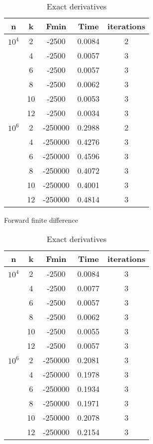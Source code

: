 \documentclass{article}
\begin{document}
\begin{table}[!htb]
    
    \begin{minipage}{.5\linewidth}
      
      \centering
        \begin{tabular}{|c c c c c |} 
 \hline
 n & k & Fmin & Time & iterations  \\ [0.5ex] 
 \hline\hline

   $10^{4}$ & 2 & -2500 &  0.0084 & 2 \\ 
  &  4 & -2500 &  0.0057 & 3\\
  &  6 & -2500 & 0.0057 & 3 \\
  &  8 & -2500 & 0.0062 & 3 \\
  &  10 & -2500 & 0.0053 & 3 \\
  &  12 & -2500 & 0.0034& 3 \\
  \hline
  $10^{6}$ & 2 & -250000 & 0.2988 & 2 \\ 
  &  4 & -250000 & 0.4276 & 3\\
  &  6 & -250000 & 0.4596 & 3\\
  &  8 & -250000 &  0.4072& 3 \\
  &  10 & -250000 & 0.4001 & 3\\
  &  12 & -250000 & 0.4814 & 3 \\
 \hline
 \end{tabular}
 \caption{Forward finite difference}
    \end{minipage}%
    \begin{minipage}{.5\linewidth}
      \centering
        
        \begin{tabular}{|c c c c c |} 
 \hline
 n & k & Fmin & Time & iterations  \\ [0.5ex] 
 \hline\hline

   $10^{4}$ & 2 & -2500 &  0.0084 & 3 \\ 
  &  4 & -2500 &  0.0077 & 3\\
  &  6 & -2500 & 0.0057 & 3 \\
  &  8 & -2500 & 0.0062 & 3 \\
  &  10 & -2500 & 0.0055 & 3 \\
  &  12 & -2500 & 0.0057 & 3 \\
  \hline
  $10^{6}$ & 2 & -250000 & 0.2081 & 3 \\ 
  &  4 & -250000 & 0.1978 & 3\\
  &  6 & -250000 & 0.1934 & 3\\
  &  8 & -250000 &  0.1971& 3 \\
  &  10 & -250000 & 0.2078 & 3\\
  &  12 & -250000 & 0.2154 & 3 \\
 \hline
 \end{tabular}
 \caption{Exact derivatives}
    \end{minipage} 
\end{table}
\end{document}

